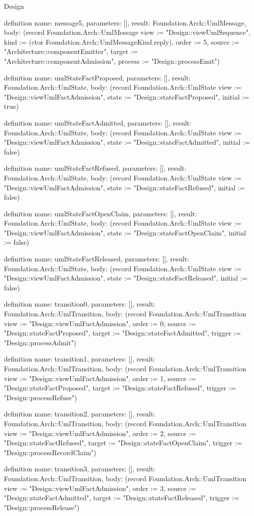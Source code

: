 \begin{lexlean}{Design}
\begin{semanticmodule}
definition{
  name: message5,
  parameters: [],
  result: Foundation.Arch::UmlMessage,
  body: (record Foundation.Arch::UmlMessage {view := "Design::viewUmlSequence", kind := (ctor Foundation.Arch::UmlMessageKind.reply), order := 5, source := "Architecture::componentEmitter", target := "Architecture::componentAdmission", process := "Design::processEmit"})
}

definition{
  name: umlStateFactProposed,
  parameters: [],
  result: Foundation.Arch::UmlState,
  body: (record Foundation.Arch::UmlState {view := "Design::viewUmlFactAdmission", state := "Design::stateFactProposed", initial := true})
}

definition{
  name: umlStateFactAdmitted,
  parameters: [],
  result: Foundation.Arch::UmlState,
  body: (record Foundation.Arch::UmlState {view := "Design::viewUmlFactAdmission", state := "Design::stateFactAdmitted", initial := false})
}

definition{
  name: umlStateFactRefused,
  parameters: [],
  result: Foundation.Arch::UmlState,
  body: (record Foundation.Arch::UmlState {view := "Design::viewUmlFactAdmission", state := "Design::stateFactRefused", initial := false})
}

definition{
  name: umlStateFactOpenClaim,
  parameters: [],
  result: Foundation.Arch::UmlState,
  body: (record Foundation.Arch::UmlState {view := "Design::viewUmlFactAdmission", state := "Design::stateFactOpenClaim", initial := false})
}

definition{
  name: umlStateFactReleased,
  parameters: [],
  result: Foundation.Arch::UmlState,
  body: (record Foundation.Arch::UmlState {view := "Design::viewUmlFactAdmission", state := "Design::stateFactReleased", initial := false})
}

definition{
  name: transition0,
  parameters: [],
  result: Foundation.Arch::UmlTransition,
  body: (record Foundation.Arch::UmlTransition {view := "Design::viewUmlFactAdmission", order := 0, source := "Design::stateFactProposed", target := "Design::stateFactAdmitted", trigger := "Design::processAdmit"})
}

definition{
  name: transition1,
  parameters: [],
  result: Foundation.Arch::UmlTransition,
  body: (record Foundation.Arch::UmlTransition {view := "Design::viewUmlFactAdmission", order := 1, source := "Design::stateFactProposed", target := "Design::stateFactRefused", trigger := "Design::processRefuse"})
}

definition{
  name: transition2,
  parameters: [],
  result: Foundation.Arch::UmlTransition,
  body: (record Foundation.Arch::UmlTransition {view := "Design::viewUmlFactAdmission", order := 2, source := "Design::stateFactRefused", target := "Design::stateFactOpenClaim", trigger := "Design::processRecordClaim"})
}

definition{
  name: transition3,
  parameters: [],
  result: Foundation.Arch::UmlTransition,
  body: (record Foundation.Arch::UmlTransition {view := "Design::viewUmlFactAdmission", order := 3, source := "Design::stateFactAdmitted", target := "Design::stateFactReleased", trigger := "Design::processRelease"})
}
\end{semanticmodule}
\end{lexlean}
